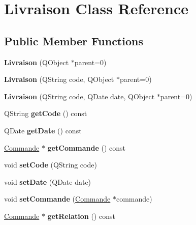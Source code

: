 \hypertarget{class_livraison}{
\section{Livraison Class Reference}
\label{class_livraison}
}
\subsection*{Public Member Functions}
\begin{DoxyCompactItemize}
\item 
\hypertarget{class_livraison_a7d0434db6895a5c160450268979f6445}{
{\bfseries Livraison} (QObject $\ast$parent=0)}
\label{class_livraison_a7d0434db6895a5c160450268979f6445}

\item 
\hypertarget{class_livraison_ad9c960946be0da63ba538505a182f957}{
{\bfseries Livraison} (QString code, QObject $\ast$parent=0)}
\label{class_livraison_ad9c960946be0da63ba538505a182f957}

\item 
\hypertarget{class_livraison_aab0f1710bec755837986685a7931f0c4}{
{\bfseries Livraison} (QString code, QDate date, QObject $\ast$parent=0)}
\label{class_livraison_aab0f1710bec755837986685a7931f0c4}

\item 
\hypertarget{class_livraison_ac45873bb957ef8d5e889900219896723}{
QString {\bfseries getCode} () const }
\label{class_livraison_ac45873bb957ef8d5e889900219896723}

\item 
\hypertarget{class_livraison_a410732dc51aae0c4e3cf5451ca46cc2c}{
QDate {\bfseries getDate} () const }
\label{class_livraison_a410732dc51aae0c4e3cf5451ca46cc2c}

\item 
\hypertarget{class_livraison_acec633d570add8bbbed748813b78cc6d}{
\hyperlink{class_commande}{Commande} $\ast$ {\bfseries getCommande} () const }
\label{class_livraison_acec633d570add8bbbed748813b78cc6d}

\item 
\hypertarget{class_livraison_a2ac000fbaf9779d2d661a2cb291a6346}{
void {\bfseries setCode} (QString code)}
\label{class_livraison_a2ac000fbaf9779d2d661a2cb291a6346}

\item 
\hypertarget{class_livraison_a97b2860e0a932cad26bce0919cad84a7}{
void {\bfseries setDate} (QDate date)}
\label{class_livraison_a97b2860e0a932cad26bce0919cad84a7}

\item 
\hypertarget{class_livraison_a083935cbe0de82f77ce44b0ee2a114b4}{
void {\bfseries setCommande} (\hyperlink{class_commande}{Commande} $\ast$commande)}
\label{class_livraison_a083935cbe0de82f77ce44b0ee2a114b4}

\item 
\hypertarget{class_livraison_a63578ea3b8a259a385914705a0d26459}{
\hyperlink{class_commande}{Commande} $\ast$ {\bfseries getRelation} () const }
\label{class_livraison_a63578ea3b8a259a385914705a0d26459}

\end{DoxyCompactItemize}
